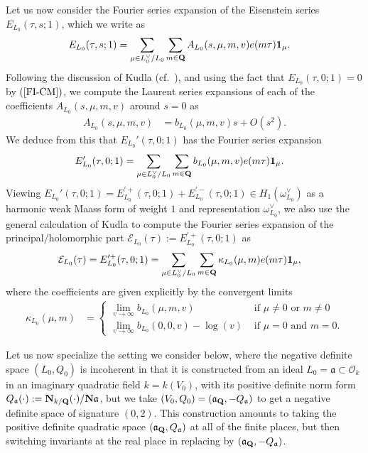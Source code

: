 \documentclass{amsart}
\theoremstyle{definition}
\theoremstyle{definition}
\theoremstyle{definition}
\begin{document}
Let us now consider the Fourier series expansion of the Eisenstein series $E_{L_0}(\tau, s; 1)$, which we write as
\begin{align*} E_{L_0}(\tau, s; 1) &= \sum\limits_{\mu \in L_0^{\vee}/L_0} \sum\limits_{ m \in {\bf{Q}} } 
A_{L_0}(s, \mu, m, v) e(m \tau) {\bf{1}}_{\mu}. \end{align*}
Following the discussion of Kudla \cite[Theorem 2.12]{KuBF} (cf.~\cite[$\S$2.2]{BY}), and using the fact that $E_{L_0}(\tau, 0; 1) =0$ 
by $(\ref{FI-CM})$, we compute the Laurent series expansions of each of the coefficients $A_{L_0}(s, \mu, m, v)$ around $s=0$ as 
\begin{align*} A_{L_0}(s, \mu, m, v) &= b_{L_0}(\mu, m, v) s + O(s^2). \end{align*}
We deduce from this that $E_{L_0}'(\tau, 0; 1)$ has the Fourier series expansion 
\begin{align*} E_{L_0}'(\tau, 0; 1) &= \sum\limits_{\mu \in L_0^{\vee}/L_0} \sum\limits_{m \in {\bf{Q}}} b_{L_0}(\mu, m, v) e(m \tau) {\bf{1}}_{\mu}. \end{align*}
Viewing $E_{L_0}'(\tau, 0; 1) = E_{L_0}^{\prime +}(\tau, 0; 1) + E_{L_0}^{\prime -}(\tau, 0; 1) \in H_1(\omega_{L_0}^{\vee})$ 
as a harmonic weak Maass form of weight $1$ and representation $\omega_{L_0}^{\vee}$,
we also use the general calculation of Kudla \cite[Theorem 2.12]{KuBF} to compute the Fourier series expansion
of the principal/holomorphic part $\mathcal{E}_{L_0}(\tau) := E_{L_0}^{\prime +}(\tau, 0; 1)$ as 
\begin{align}\label{E+CM}\mathcal{E}_{L_0}(\tau) = E_{L_0}^{\prime +}(\tau, 0; 1) 
&= \sum\limits_{\mu \in L_0^{\vee}/L_0} \sum_{m \in {\bf{Q}}} \kappa_{L_0}(\mu, m) e(m \tau) {\bf{1}}_{\mu},\end{align}
where the coefficients are given explicitly by the convergent limits 
\begin{align*} \kappa_{L_0}(\mu, m) &= \begin{cases} \lim_{v \rightarrow \infty} b_{L_0}(\mu, m, v) &\text{ if $\mu \neq 0$ or $m \neq 0$} \\
\lim_{v \rightarrow \infty} b_{L_0}(0, 0, v) - \log(v) &\text{ if $\mu=0$ and $m=0$}. \end{cases} \end{align*}

Let us now specialize the setting we consider below, where the negative definite space $(L_0, Q_0)$
is incoherent in that it is constructed from an ideal $L_0 = \mathfrak{a} \subset \mathcal{O}_k$
in an imaginary quadratic field $k = k(V_0)$, with its positive definite norm form 
$Q_{\mathfrak{a}}(\cdot) := {\bf{N}}_{k/{\bf{Q}}}(\cdot)/{\bf{N}} \mathfrak{a}$, but we take $(V_0, Q_0) = (\mathfrak{a}_{\bf{Q}}, - Q_{\mathfrak{a}})$ 
to get a negative definite space of signature $(0,2)$. This construction amounts to taking the positive definite quadratic space 
$(\mathfrak{a}_{\bf{Q}}, Q_{\mathfrak{a}})$ at all of the finite places, but then switching invariants at the real place in replacing by $(\mathfrak{a}_{{\bf{Q}}}, - Q_{\mathfrak{a}})$. 
\end{document}
